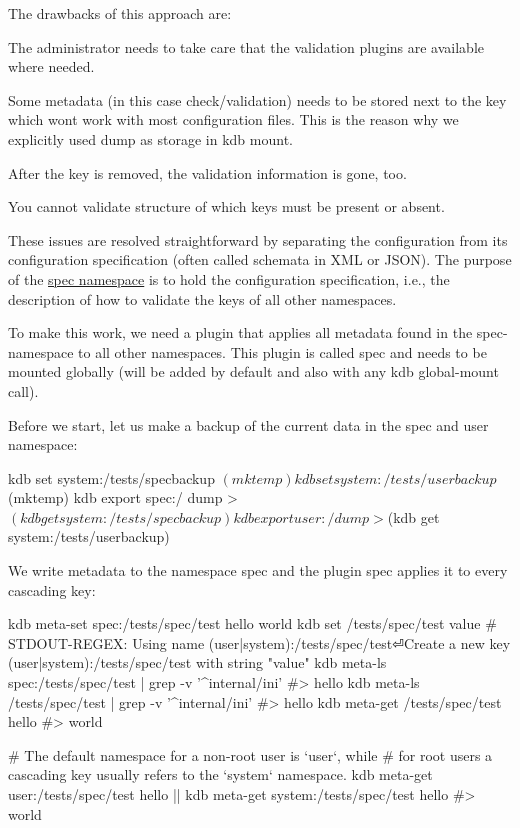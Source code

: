 The drawbacks of this approach are\+:


\begin{DoxyItemize}
\item The administrator needs to take care that the validation plugins are available where needed.
\item Some metadata (in this case {\ttfamily check/validation}) needs to be stored next to the key which won\textquotesingle{}t work with most configuration files. This is the reason why we explicitly used {\ttfamily dump} as storage in {\ttfamily kdb mount}.
\item After the key is removed, the validation information is gone, too.
\item You cannot validate structure of which keys must be present or absent.
\end{DoxyItemize}

These issues are resolved straightforward by separating the configuration from its configuration specification (often called schemata in X\+ML or J\+S\+ON). The purpose of the \hyperlink{doc_tutorials_namespaces_md}{spec namespace} is to hold the configuration specification, i.\+e., the description of how to validate the keys of all other namespaces.

To make this work, we need a plugin that applies all metadata found in the {\ttfamily spec}-\/namespace to all other namespaces. This plugin is called {\ttfamily spec} and needs to be mounted globally (will be added by default and also with any {\ttfamily kdb global-\/mount} call).

Before we start, let us make a backup of the current data in the spec and user namespace\+:


\begin{DoxyCode}
kdb set system:/tests/specbackup $(mktemp)
kdb set system:/tests/userbackup $(mktemp)
kdb export spec:/ dump > $(kdb get system:/tests/specbackup)
kdb export user:/ dump > $(kdb get system:/tests/userbackup)
\end{DoxyCode}


We write metadata to the namespace {\ttfamily spec} and the plugin {\ttfamily spec} applies it to every cascading key\+:


\begin{DoxyCode}
kdb meta-set spec:/tests/spec/test hello world
kdb set /tests/spec/test value
# STDOUT-REGEX: Using name (user|system):/tests/spec/test⏎Create a new key (user|system):/tests/spec/test
       with string "value"
kdb meta-ls spec:/tests/spec/test | grep -v '^internal/ini'
#> hello
kdb meta-ls /tests/spec/test | grep -v '^internal/ini'
#> hello
kdb meta-get /tests/spec/test hello
#> world

# The default namespace for a non-root user is `user`, while
# for root users a cascading key usually refers to the `system` namespace.
kdb meta-get user:/tests/spec/test hello || kdb meta-get system:/tests/spec/test hello
#> world
\end{DoxyCode}


